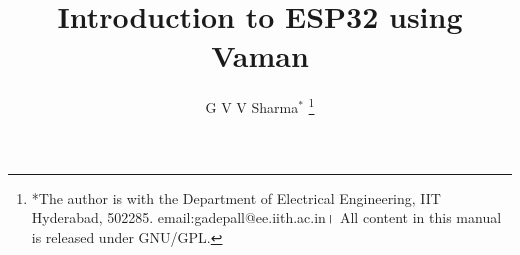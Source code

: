 \documentclass[journal,12pt,twocolumn]{IEEEtran}
\renewcommand\thesection{\arabic{section}}
\begin{document}
\let\StandardTheFigure\thefigure
\let\vec\mathbf
\renewcommand{\thefigure}{\thesection}



\def\putbox#1#2#3{\makebox[0in][l]{\makebox[#1][l]{}\raisebox{\baselineskip}[0in][0in]{\raisebox{#2}[0in][0in]{#3}}}}
     \def\rightbox#1{\makebox[0in][r]{#1}}
     \def\centbox#1{\makebox[0in]{#1}}
     \def\topbox#1{\raisebox{-\baselineskip}[0in][0in]{#1}}
     \def\midbox#1{\raisebox{-0.5\baselineskip}[0in][0in]{#1}}

\vspace{3cm}

\title{
Introduction to ESP32 using Vaman
}
\author{ 
G V V Sharma$^{*}$%
	\thanks{*The author is with the Department of Electrical Engineering, IIT Hyderabad, 502285. email:gadepall@ee.iith.ac.in। All content in this manual is released under GNU/GPL.}
	
}	


%
%
%
\end{document}
